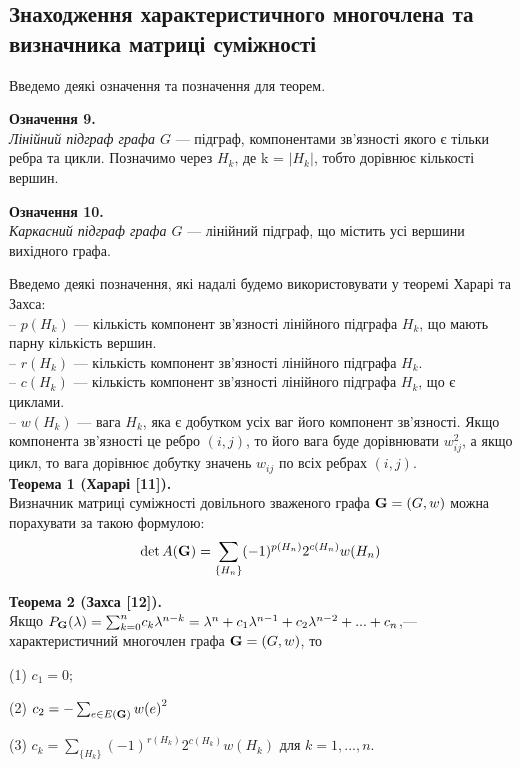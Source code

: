 \subsection{Знаходження характеристичного многочлена та визначника матриці суміжності}
Введемо деякі означення та позначення для теорем.

\textbf{Означення 9.}\\
 {\it Лінійний підграф графа ${G}$} --- підграф, компонентами зв'язності якого є тільки ребра та цикли. Позначимо через $H_k$, де k = $|H_k|$, тобто дорівнює кількості вершин.
 
 \textbf{Означення 10.}\\
 {\it Каркасний підграф графа ${G}$} --- лінійний підграф, що містить усі вершини вихідного графа. 

Введемо деякі позначення, які надалі будемо використовувати у теоремі Харарі та Захса:\\
-- $p(H_{k})$ --- кількість компонент зв'язності лінійного підграфа $H_{k}$, що мають парну кількість вершин.\\
-- $r(H_{k})$ --- кількість компонент зв'язності лінійного підграфа $H_{k}$.\\
-- $c(H_{k})$ --- кількість компонент зв'язності лінійного підграфа $H_{k}$, що є циклами.\\
-- $w(H_{k})$ --- вага $H_{k}$, яка є добутком усіх ваг його
компонент зв'язності. Якщо компонента зв'язності це ребро
$(i,j)$, то його вага буде дорівнювати $w_{i j}^2$, а якщо цикл, то  вага дорівнює добутку значень $w_{i j}$ по всіх ребрах $(i,j)$.\\

\textbf{Теорема 1 (Харарі [11]). }\\
 Визначник матриці суміжності довільного зваженого графа ${\bf G} =(G,w)$ можна порахувати за такою формулою:
 \begin{equation}\label{eq2}
     \det A({\bf G})=\sum_{\{H_{n}\}}(-1)^{p(H_{n})}2^{c(H_{n})}w(H_{n})
 \end{equation}
 
\textbf{Теорема 2 (Захса [12]). }\\ 
Якщо $P_{\bf G}(\lambda)={\sum_{k=0}^{n}}c_{k}\lambda^{n-k}=\lambda^n+c_{1}\lambda^{n-1}+c_{2}\lambda^{n-2}+...+c_{n}$,---
характеристичний многочлен графа ${\bf G} =(G,w)$, то


(1) $c_{1}=0$;

(2) $c_{2}=-\sum_{e\in E({\bf G})} {w(e)}^2$

(3) $c_{k}=\sum_{\{H_{k}\}}(-1)^{r(H_{k})}2^{c(H_{k})}w(H_{k})$ для
$k=1,...,n.$\\

